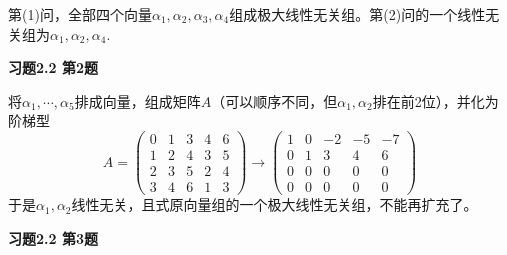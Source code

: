 第(1)问，全部四个向量$\alpha_1,\alpha_2,\alpha_3,\alpha_4$组成极大线性无关组。第(2)问的一个线性无关组为$\alpha_1,\alpha_2,\alpha_4$.

\newpageorvspace

{\bf 习题2.2 第2题}

将$\alpha_1,\cdots,\alpha_5$排成向量，组成矩阵$A$（可以顺序不同，但$\alpha_1,\alpha_2$排在前2位），并化为阶梯型
$$
A = \begin{pmatrix} 0 & 1 & 3 & 4 & 6 \\ 1 & 2 & 4 & 3 & 5 \\ 2 & 3 & 5 & 2 & 4 \\ 3 & 4 & 6 & 1 & 3 \end{pmatrix} \to
\begin{pmatrix} 1 & 0 & -2 & -5 & -7 \\ 0 & 1 & 3 & 4 & 6 \\ 0 & 0 & 0 & 0 & 0 \\ 0 & 0 & 0 & 0 & 0 \end{pmatrix}
$$
于是$\alpha_1,\alpha_2$线性无关，且式原向量组的一个极大线性无关组，不能再扩充了。

\newpageorvspace

{\bf 习题2.2 第3题}

